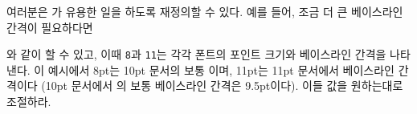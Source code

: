 여러분은 \cmd{\makethanksmarkhook}가 유용한 일을 하도록 재정의할 수 있다.
예를 들어, 조금 더 큰 베이스라인 간격이 필요하다면
\begin{lcode}
\renewcommand{\makethanksmarkhook}{\fontsize{8}{11}\selectfont}
\end{lcode}
와 같이 할 수 있고, 이때 \texttt{8}과 \texttt{11}는 각각 폰트의 포인트 크기와
베이스라인 간격을 나타낸다.
이 예시에서 8pt는 10pt 문서의 보통 이며, 11pt는 11pt 문서에서
베이스라인 간격이다 (10pt 문서에서 \cmd{\footnotesize}의 보통 베이스라인 간격은
9.5pt이다).
이들 값을 원하는대로 조절하라.

